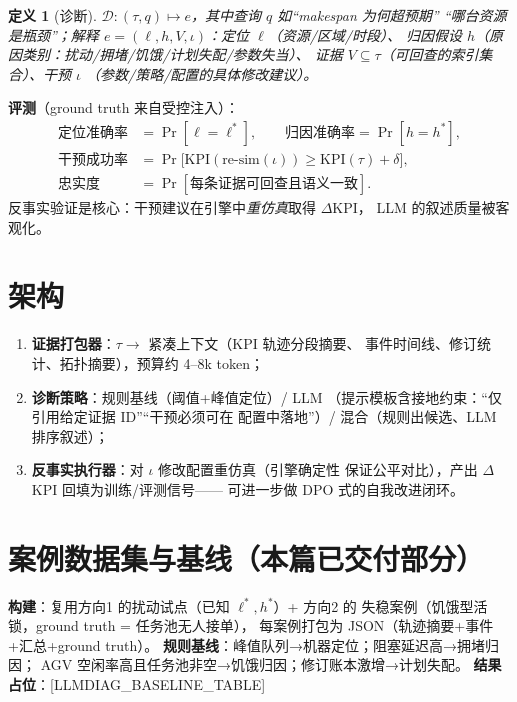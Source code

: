 \documentclass[UTF8,12pt,a4paper]{ctexart}
\newtheorem{definition}{定义}
\begin{document}
\begin{definition}[诊断]
$\mathcal{D}: (\tau, q) \mapsto e$，其中查询 $q$ 如``makespan 为何超预期''
``哪台资源是瓶颈''；解释
$e = (\ell, h, V, \iota)$：定位 $\ell$（资源/区域/时段）、
归因假设 $h$（原因类别：扰动/拥堵/饥饿/计划失配/参数失当）、
证据 $V\subseteq\tau$（可回查的索引集合）、干预 $\iota$
（参数/策略/配置的具体修改建议）。
\end{definition}

\textbf{评测}（ground truth 来自受控注入）：
\begin{align}
\text{定位准确率} &= \Pr[\ell = \ell^*], \qquad
\text{归因准确率} = \Pr[h = h^*],\\
\text{干预成功率} &= \Pr\bigl[\mathrm{KPI}(\text{re-sim}(\iota)) \ge \mathrm{KPI}(\tau) + \delta\bigr],\\
\text{忠实度} &= \Pr[\text{每条证据可回查且语义一致}].
\end{align}
反事实验证是核心：干预建议在引擎中\emph{重仿真}取得 $\Delta$KPI，
LLM 的叙述质量被客观化。

\section{架构}\label{sec:arch}

\begin{enumerate}
  \item \textbf{证据打包器}：$\tau\to$ 紧凑上下文（KPI 轨迹分段摘要、
    事件时间线、修订统计、拓扑摘要），预算约 4--8k token；
  \item \textbf{诊断策略}：规则基线（阈值+峰值定位）/ LLM
    （提示模板含接地约束：``仅引用给定证据 ID''``干预必须可在
    配置中落地''）/ 混合（规则出候选、LLM 排序叙述）；
  \item \textbf{反事实执行器}：对 $\iota$ 修改配置重仿真（引擎确定性
    保证公平对比），产出 $\Delta$KPI 回填为训练/评测信号——
    可进一步做 DPO 式的自我改进闭环。
\end{enumerate}

\section{案例数据集与基线（本篇已交付部分）}

\textbf{构建}：复用方向1 的扰动试点（已知 $\ell^*,h^*$）+ 方向2 的
失稳案例（饥饿型活锁，ground truth = 任务池无人接单），
每案例打包为 JSON（轨迹摘要+事件+汇总+ground truth）。
\textbf{规则基线}：峰值队列→机器定位；阻塞延迟高→拥堵归因；
AGV 空闲率高且任务池非空→饥饿归因；修订账本激增→计划失配。
\textbf{结果占位}：[LLMDIAG\_BASELINE\_TABLE]
\end{document}
